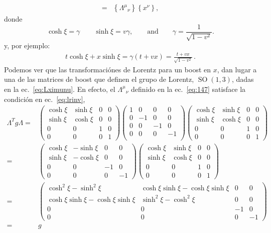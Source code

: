 \begin{frame}
\begin{align}
=&\left\{{\Lambda^\mu}_{\nu}\right\}\left\{x^\nu\right\},
\end{align}
donde
\begin{equation}
  \cosh\xi=\gamma\qquad\sinh\xi=v\gamma,\qquad\text{and}\qquad \gamma=\frac{1}{\sqrt{1-v^2}}.
\end{equation}
y, por ejemplo:
\begin{align}
  t\cosh{\xi}+x\sinh\xi=\gamma(t+v x)=\frac{t+v x}{\sqrt{1-v^2}}\,.
\end{align}
Podemos ver que las transformaciónes de Lorentz para un boost en $x$, dan lugar a una de las matrices de boost que definen el grupo de Lorentz, $\operatorname{SO}(1,3)$, dadas en la ec.~\eqref{eq:Lximunu}. En efecto, el ${\Lambda^\mu}_{\nu}$ definido en la ec.~\eqref{eq:147} satisface la condición en ec.~\eqref{eq:lrinv}, 
\begin{align}
  \label{eq:boostx}
  \Lambda^T g \Lambda=&\begin{pmatrix}
    \cosh\xi&\sinh\xi&0&0\\
    \sinh\xi&\cosh\xi&0&0\\
    0     &  0  &1&0\\
    0     &  0  &0&1
  \end{pmatrix}
  \begin{pmatrix}
    1 & 0  & 0 &0\\
    0 & -1 & 0 &0\\
    0 & 0  & -1&0\\
    0 & 0  & 0 &-1\\
  \end{pmatrix}
  \begin{pmatrix}
    \cosh\xi&\sinh\xi&0&0\\
    \sinh\xi&\cosh\xi&0&0\\
    0     &  0  &1&0\\
    0     &  0  &0&1
  \end{pmatrix}\nonumber\\
  =&\begin{pmatrix}
       \cosh\xi&-\sinh\xi&0&0\\
    \sinh\xi&-\cosh\xi&0&0\\
    0     &  0  &-1&0\\
    0     &  0  &0&-1
  \end{pmatrix}
 \begin{pmatrix}
    \cosh\xi&\sinh\xi&0&0\\
    \sinh\xi&\cosh\xi&0&0\\
    0     &  0  &1&0\\
    0     &  0  &0&1
  \end{pmatrix}\nonumber\\
  =&\begin{pmatrix}
       \cosh^2\xi-\sinh^2\xi&\cosh\xi\sinh\xi-\cosh\xi\sinh\xi&0&0\\
    \cosh\xi\sinh\xi-\cosh\xi\sinh\xi&\sinh^2\xi-\cosh^2\xi&0&0\\
    0     &  0  &-1&0\\
    0     &  0  &0&-1
  \end{pmatrix}\nonumber\\
=&g
\end{align}
\end{frame}
